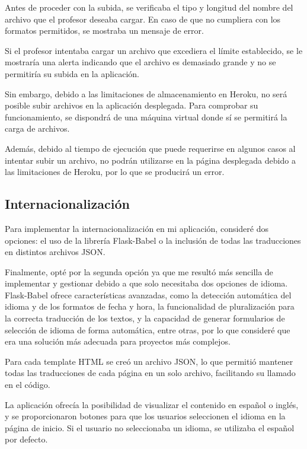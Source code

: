 Antes de proceder con la subida, se verificaba el tipo y longitud del nombre del archivo que el profesor deseaba cargar. En caso de que no cumpliera con los formatos permitidos, se mostraba un mensaje de error.

Si el profesor intentaba cargar un archivo que excediera el límite establecido, se le mostraría una alerta indicando que el archivo es demasiado grande y no se permitiría su subida en la aplicación.


Sin embargo, debido a las limitaciones de almacenamiento en Heroku, no será posible subir archivos en la aplicación desplegada. Para comprobar su funcionamiento, se dispondrá de una máquina virtual donde sí se permitirá la carga de archivos.

Además, debido al tiempo de ejecución que puede requerirse en algunos casos al intentar subir un archivo, no podrán utilizarse en la página desplegada debido a las limitaciones de Heroku, por lo que se producirá un error.

\subsection{Internacionalización}
Para implementar la internacionalización en mi aplicación, consideré dos opciones: el uso de la librería Flask-Babel o la inclusión de todas las traducciones en distintos archivos JSON.

Finalmente, opté por la segunda opción ya que me resultó más sencilla de implementar y gestionar debido a que solo necesitaba dos opciones de idioma. Flask-Babel ofrece características avanzadas, como la detección automática del idioma y de los formatos de fecha y hora, la funcionalidad de pluralización para la correcta traducción de los textos, y la capacidad de generar formularios de selección de idioma de forma automática, entre otras, por lo que consideré que era una solución más adecuada para proyectos más complejos.

Para cada template HTML se creó un archivo JSON, lo que permitió mantener todas las traducciones de cada página en un solo archivo, facilitando su llamado en el código.

La aplicación ofrecía la posibilidad de visualizar el contenido en español o inglés, y se proporcionaron botones para que los usuarios seleccionen el idioma en la página de inicio. Si el usuario no seleccionaba un idioma, se utilizaba el español por defecto.

